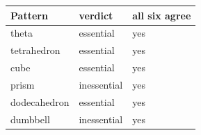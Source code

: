 \begin{tabular}{@{}lll@{}}
\toprule
Pattern & verdict & all six agree \\
\midrule
theta & essential & yes \\
tetrahedron & essential & yes \\
cube & essential & yes \\
prism & inessential & yes \\
dodecahedron & essential & yes \\
dumbbell & inessential & yes \\
\bottomrule
\end{tabular}
